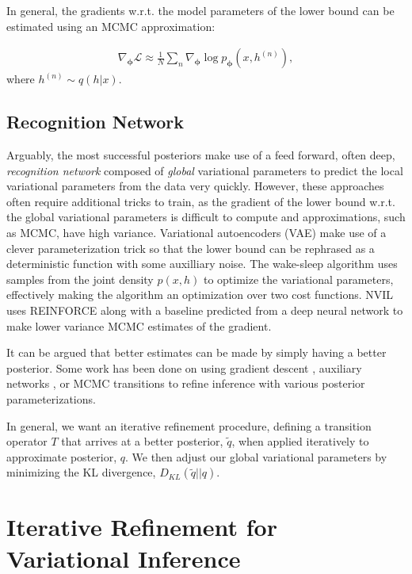 \documentclass{article} %
\newcommand{\vects}[1]{\boldsymbol{#1}}
\newcommand{\PP}[0]{\vects{\phi}}
\newcommand{\LL}[0]{\mathcal{L}}
\begin{document}
In general, the gradients w.r.t. the model parameters of the lower bound can be estimated using an MCMC approximation:

\begin{align}
\nabla_{\PP} \LL \approx \frac{1}{N} \sum_n \nabla_{\PP} \log p_{\PP}(x, h^{(n)}),
\end{align}
where $h^{(n)} \sim q(h|x)$.

\subsection{Recognition Network}
Arguably, the most successful posteriors make use of a feed forward, often deep, \emph{recognition network} composed of \emph{global} variational parameters to predict the local variational parameters from the data very quickly. However, these approaches often require additional tricks to train, as the gradient of the lower bound w.r.t. the global variational parameters is difficult to compute and approximations, such as MCMC, have high variance. Variational autoencoders (VAE) \citep{kingma2013auto} make use of a clever parameterization trick so that the lower bound can be rephrased as a deterministic function with some auxilliary noise. The wake-sleep algorithm uses samples from the joint density $p(x, h)$ to optimize the variational parameters, effectively making the algorithm an optimization over two cost functions. NVIL uses REINFORCE along with a baseline predicted from a deep neural network to make lower variance MCMC estimates of the gradient.

It can be argued that better estimates can be made by simply having a better posterior. Some work has been done on using gradient descent \citep{hoffman2013stochastic}, auxiliary networks \citep{rezende2015variational}, or MCMC transitions \citep{salimans2014markov} to refine inference with various posterior parameterizations. 

In general, we want an iterative refinement procedure, defining a transition operator $T$ that arrives at a better posterior, $\tilde{q}$, when applied iteratively to approximate posterior, $q$. We then adjust our global variational parameters by minimizing the KL divergence, $D_{KL}(\tilde{q}||q)$.

\section{Iterative Refinement for Variational Inference}
\end{document}
